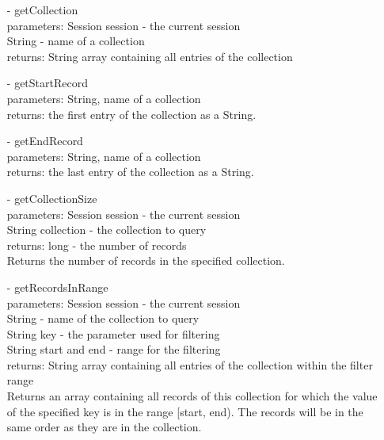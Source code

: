 \documentclass[oneside, english, final]{design}
\begin{document}
\begin{itemize}
\begin{itemize}
		      \item[-]getCollection
		            \\parameters: Session session - the current session
		            \\String - name of a collection
		            \\returns: String array containing all entries of the collection

		      \item[-]getStartRecord
		            \\parameters: String, name of a collection
		            \\returns: the first entry of the collection as a String.

		      \item[-]getEndRecord
		            \\parameters: String, name of a collection
		            \\returns: the last entry of the collection as a String.

		      \item[-]getCollectionSize
		            \\parameters: Session session - the current session
		            \\String collection - the collection to query
		            \\returns: long - the number of records
		            \\Returns the number of records in the specified collection.

		      \item[-]getRecordsInRange
		            \\parameters: Session session - the current session
		            \\String - name of the collection to query
		            \\String key - the parameter used for filtering
		            \\String start and end - range for the filtering
		            \\returns: String array containing all entries of the collection within the filter range
		            \\ Returns an array containing all records of this
		            collection for which the value of the
		            specified key is in the range [start, end).
		            The records will be in the same order as
		            they are in the collection.


\end{itemize}
\end{itemize}
\end{document}
